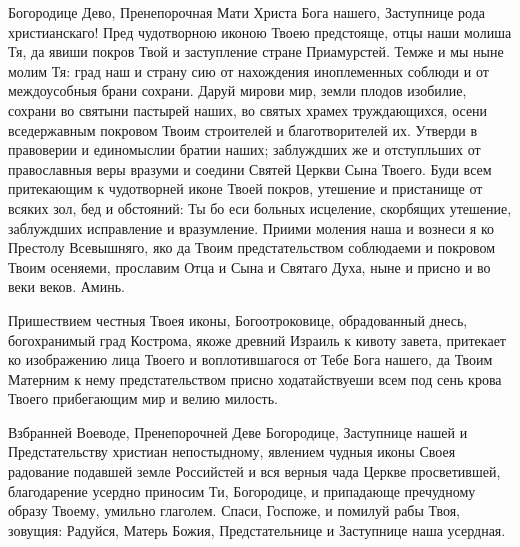 Богородице Дево, Пренепорочная Мати Христа Бога нашего, Заступнице рода христианскаго! Пред чудотворною иконою Твоею предстояще, отцы наши молиша Тя, да явиши покров Твой и заступление стране Приамурстей. Темже и мы ныне молим Тя: град наш и страну сию от нахождения иноплеменных соблюди и от междоусобныя брани сохрани. Даруй мирови мир, земли плодов изобилие, сохрани во святыни пастырей наших, во святых храмех труждающихся, осени вседержавным покровом Твоим строителей и благотворителей их. Утверди в правоверии и единомыслии братии наших; заблуждших же и отступльших от православныя веры вразуми и соедини Святей Церкви Сына Твоего. Буди всем притекающим к чудотворней  иконе Твоей покров, утешение и пристанище от всяких зол, бед и обстояний: Ты бо еси больных исцеление, скорбящих утешение, заблуждших исправление и вразумление. Приими моления наша и вознеси я ко Престолу Всевышняго, яко да Твоим предстательством соблюдаеми и покровом Твоим осеняеми, прославим Отца и Сына и Святаго Духа, ныне и присно и во веки веков. Аминь. 
\mychapterending

 
\vspace{-\baselineskip}



Пришествием честныя Твоея иконы, Богоотроковице, обрадованный днесь, богохранимый град Кострома, якоже древний Израиль к кивоту завета, притекает ко изображению лица Твоего и воплотившагося от Тебе Бога нашего, да Твоим Матерним к нему предстательством присно ходатайствуеши всем под сень крова Твоего прибегающим мир и велию милость.




Взбранней Воеводе, Пренепорочней Деве Богородице, Заступнице нашей и Предстательству христиан непостыдному, явлением чудныя иконы Своея радование подавшей земле Российстей и вся верныя чада Церкве просветившей, благодарение усердно приносим Ти, Богородице, и припадающе пречудному образу Твоему, умильно глаголем. Спаси, Госпоже, и помилуй рабы Твоя, зовущия: Радуйся, Матерь Божия, Предстательнице и Заступнице наша усердная.




